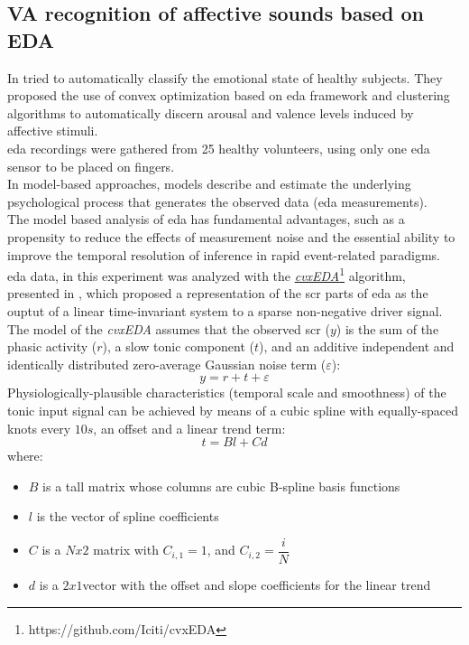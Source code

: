 \subsection{VA recognition of affective sounds based on EDA}
In \cite{greco2016arousal} tried to automatically classify the emotional state of healthy subjects. They proposed the use of convex optimization based on \gls{eda} framework and clustering algorithms to automatically discern arousal and valence levels induced by affective stimuli.
\\ \indent
\gls{eda} recordings were gathered from 25 healthy volunteers, using only one \gls{eda} sensor to be placed on fingers.
\\
In model-based approaches, models describe and estimate the underlying psychological process that generates the observed data (\gls{eda} measurements).
\\
The model based analysis of \gls{eda} has fundamental advantages, such as a propensity to reduce the effects of measurement noise and the essential ability to improve the temporal resolution of inference in rapid event-related paradigms.
\\ \indent
\gls{eda} data, in this experiment was analyzed with the \href{https://github.com/Iciti/cvxEDA}{\textit{cvxEDA}}\footnote{https://github.com/Iciti/cvxEDA} algorithm, presented in \cite{greco2015cvxeda}, which proposed a representation of the \gls{scr} parts of \gls{eda} as the ouptut of a linear time-invariant system to a sparse non-negative driver signal.
\\
The model of the \textit{cvxEDA} assumes that the observed \gls{scr} ($y$) is the sum of the phasic activity ($r$), a slow tonic component ($t$), and an additive independent and identically distributed zero-average Gaussian noise term ($\varepsilon$):
\begin{equation}
	y=r+t+\varepsilon
\end{equation}
Physiologically-plausible characteristics (temporal scale and smoothness) of the tonic input signal can be achieved by means of a cubic spline with equally-spaced knots every $10s$, an offset and a linear trend term:
\begin{equation}
	\label{eq:tonic_model}
	t=Bl+Cd
\end{equation}
where:
\begin{itemize}
	\item $B$ is a tall matrix whose columns are cubic B-spline basis functions
	\item $l$ is the vector of spline coefficients
	\item $C$ is a $Nx2$ matrix with $C_{i,1} = 1$, and $C_{i,2} = \dfrac{i}{N}$
	\item $d$ is a $2x1$vector with the offset and slope coefficients for the linear trend
\end{itemize}
